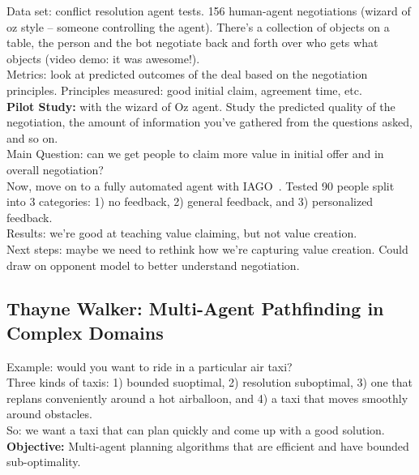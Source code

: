 Data set: conflict resolution agent tests. 156 human-agent negotiations (wizard of oz style -- someone controlling the agent). There's a collection of objects on a table, the person and the bot negotiate back and forth over who gets what objects (video demo: it was awesome!). \\

Metrics: look at predicted outcomes of the deal based on the negotiation principles. Principles measured: good initial claim, agreement time, etc. \\

{\bf Pilot Study:} with the wizard of Oz agent. Study the predicted quality of the negotiation, the amount of information you've gathered from the questions asked, and so on. \\

Main Question: can we get people to claim more value in initial offer and in overall negotiation? \\

Now, move on to a fully automated agent with IAGO~\cite{mell2016iago}. Tested 90 people split into 3 categories: 1) no feedback, 2) general feedback, and 3) personalized feedback. \\

Results: we're good at teaching value claiming, but not value creation. \\

Next steps: maybe we need to rethink how we're capturing value creation. Could draw on opponent model to better understand negotiation. \\

\subsection{Thayne Walker: Multi-Agent Pathfinding in Complex Domains}

Example: would you want to ride in a particular air taxi? \\

Three kinds of taxis: 1) bounded suoptimal, 2) resolution suboptimal, 3) one that replans conveniently around a hot airballoon, and 4) a taxi that moves smoothly around obstacles. \\

So: we want a taxi that can plan quickly and come up with a good solution. \\

{\bf Objective:} Multi-agent planning algorithms that are efficient and have bounded sub-optimality. \\

